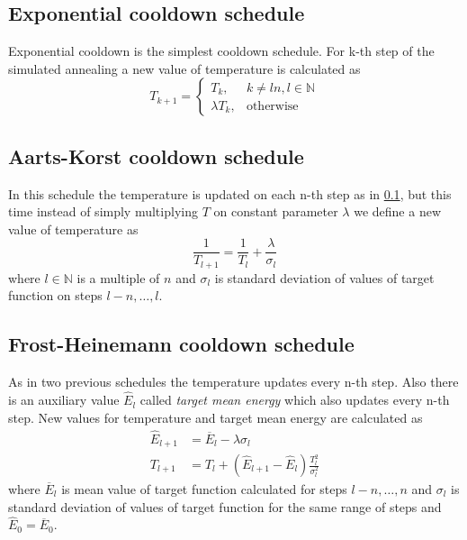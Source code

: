 \documentclass[preprint,amsmath,amssymb,aps,pre]{revtex4-1}
\begin{document}
\subsection{Exponential cooldown schedule}
\label{sec:cooldown-exp}
Exponential cooldown is the simplest cooldown schedule. For k-th step of the
simulated annealing a new value of temperature is calculated as
\begin{equation*}
  T_{k+1} =
  \begin{cases}
    T_k, & k \ne ln, l \in \mathbb{N} \\
    \lambda T_k, & \text{otherwise}
  \end{cases}
\end{equation*}

\subsection{Aarts-Korst cooldown schedule}
\label{sec:cooldown-aarts-korst}
In this schedule the temperature is updated on each n-th step as in
\cref{sec:cooldown-exp}, but this time instead of simply multiplying $T$ on
constant parameter $\lambda$ we define a new value of temperature as
\begin{equation*}
  \frac{1}{T_{l+1}} = \frac{1}{T_l} + \frac{\lambda}{\sigma_l}
\end{equation*}
where $l \in \mathbb{N}$ is a multiple of $n$ and $\sigma_{l}$ is standard
deviation of values of target function on steps $l-n, \dots, l$.

\subsection{Frost-Heinemann cooldown schedule}
\label{sec:cooldown-frost-heinemann}
As in two previous schedules the temperature updates every n-th step. Also there
is an auxiliary value $\hat{E}_l$ called \textit{target mean energy} which also
updates every n-th step. New values for temperature and target mean energy are
calculated as
\begin{align*}
  \hat{E}_{l+1} & = \overline{E}_l - \lambda \sigma_l \\
  T_{l+1} & = T_l + (\hat{E}_{l+1} - \hat{E}_l)\frac{T^2_l}{\sigma^2_l}
\end{align*}
where $\overline{E}_l$ is mean value of target function calculated for
steps $l-n,\dots,n$ and $\sigma_l$ is standard deviation of values of
target function for the same range of steps and $\hat{E}_0 = \overline{E}_0$.
\end{document}
